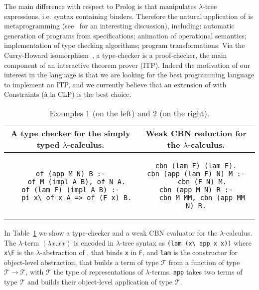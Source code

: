 \documentclass{llncs}
\begin{document}
The main difference with respect to Prolog is that \lp{} manipulates $\lambda$-tree expressions, i.e. syntax containing binders. Therefore the natural application of \lp{} is metaprogramming (see~\cite{thefrenchguy} for an interesting discussion), including: automatic generation of programs from specifications; animation of operational semantics; implementation of type checking algorithms; program transformations. Via the Curry-Howard isomorphism~\cite{curryhoward}, a type-checker is a proof-checker, the main component of an interactive theorem prover (ITP). Indeed the motivation of our interest in the language is that we are looking for the best programming language to implement an ITP, and we currently believe that an extension of \lp{} with Constraints (\`a la CLP) is the best choice.

\begin{table}
\begin{center}
\begin{tabular}{c@{~~}|@{~~}c}
A type checker for the simply typed $\lambda$-calculus. &
Weak CBN reduction for the $\lambda$-calculus.\\\hline
\begin{minipage}{5.0cm}
\begin{verbatim}
of (app M N) B :-
   of M (impl A B), of N A.
of (lam F) (impl A B) :-
   pi x\ of x A => of (F x) B.

\end{verbatim}
\end{minipage}
&
\begin{minipage}{5.0cm}
\begin{verbatim}
cbn (lam F) (lam F).
cbn (app (lam F) N) M :-
   cbn (F N) M.
cbn (app M N) R :-
   cbn M MM, cbn (app MM N) R.
\end{verbatim}
\end{minipage}
\end{tabular}
\end{center}
\caption{\label{example1} Examples 1 (on the left) and 2 (on the right).}
\end{table}
In Table~\ref{example1} we show a type-checker and a weak CBN evaluator for the
$\lambda$-calculus. The $\lambda$-term $(\lambda x.xx)$ is encoded in
$\lambda$-tree syntax as \verb+(lam (x\ app x x))+ where \verb+x\F+ is
the $\lambda$-abstraction of \lp{}, that binds \verb+x+ in \verb+F+, and
\verb+lam+ is the constructor for object-level abstraction, that builds
a term of type $\mathcal{T}$ from a function of type
$\mathcal{T} \to \mathcal{T}$, with $\mathcal{T}$ the type of representations
of $\lambda$-terms. \verb+app+ takes two terms of type $\mathcal{T}$ and builds
their object-level application of type $\mathcal{T}$.
\end{document}
